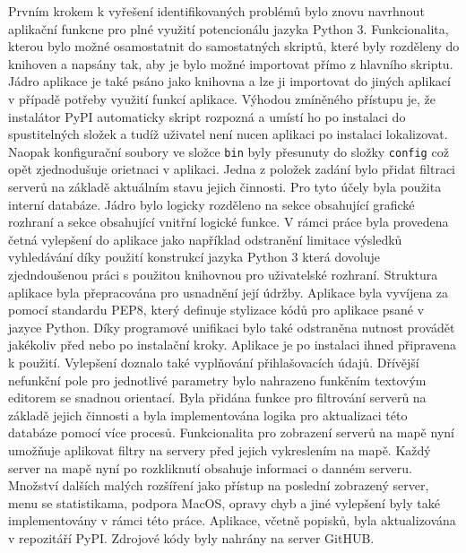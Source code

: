 \documentclass[%
  12pt,       				%
  a4paper,    				%
	unicode,						%
]{report}				    	%
\begin{document}
Prvním krokem k vyřešení identifikovaných problémů bylo znovu navrhnout aplikační funkcne pro plné využití potencionálu jazyka Python 3. Funkcionalita, kterou bylo možné osamostatnit do samostatných skriptů, které byly rozděleny do knihoven a napsány tak, aby je bylo možné importovat přímo z hlavního skriptu. Jádro aplikace je také psáno jako knihovna a lze ji importovat do jiných aplikací v případě potřeby využití funkcí aplikace. Výhodou zmíněného přístupu je, že instalátor PyPI automaticky skript rozpozná a umístí ho po instalaci do spustitelných složek a tudíž uživatel není nucen aplikaci po instalaci lokalizovat. Naopak konfigurační soubory ve složce \texttt{bin} byly přesunuty do složky \texttt{config} což opět zjednodušuje orietnaci v aplikaci. Jedna z položek zadání bylo přidat filtraci serverů na základě aktuálním stavu jejich činnosti. Pro tyto účely byla použita interní databáze. Jádro bylo logicky rozděleno na sekce obsahující grafické rozhraní a sekce obsahující vnitřní logické funkce. V rámci práce byla provedena četná vylepšení do aplikace jako například odstranění limitace výsledků vyhledávání díky použití konstrukcí jazyka Python 3 která dovoluje zjedndoušenou práci s použitou knihovnou pro uživatelské rozhraní. Struktura aplikace byla přepracována pro usnadnění její údržby. Aplikace byla vyvíjena za pomocí standardu PEP8, který definuje stylizace kódů pro aplikace psané v jazyce Python. Díky programové unifikaci bylo také odstraněna nutnost provádět jakékoliv před nebo po instalační kroky. Aplikace je po instalaci ihned připravena k použití. Vylepšení doznalo také vyplňování přihlašovacích údajů. Dřívější nefunkční pole pro jednotlivé parametry bylo nahrazeno funkčním textovým editorem se snadnou orientací. Byla přidána funkce pro filtrování serverů na základě jejich činnosti a byla implementována logika pro aktualizaci této databáze pomocí více procesů. Funkcionalita pro zobrazení serverů na mapě nyní umožňuje aplikovat filtry na servery před jejich vykreslením na mapě. Každý server na mapě nyní po rozkliknutí obsahuje informaci o danném serveru. Množství dalších malých rozšíření jako přístup na poslední zobrazený server, menu se statistikama, podpora MacOS, opravy chyb a jiné vylepšení byly také implementovány v rámci této práce. Aplikace, včetně popisků, byla aktualizována v repozitáří PyPI. Zdrojové kódy byly nahrány na server GitHUB.\\


\vytvorprohlaseni

\vytvorpodekovani
\end{document}
